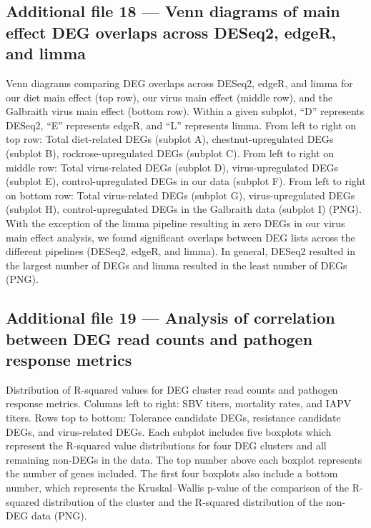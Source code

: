 \documentclass{bmcart}
\begin{document}
\begin{linenumbers}
\begin{backmatter}
   \subsection*{Additional file 18 --- Venn diagrams of main effect DEG overlaps across DESeq2, edgeR, and limma}
  Venn diagrams comparing DEG overlaps across DESeq2, edgeR, and limma for our diet main effect (top row), our virus main effect (middle row), and the Galbraith virus main effect (bottom row). Within a given subplot, ``D'' represents DESeq2, ``E'' represents edgeR, and ``L'' represents limma. From left to right on top row: Total diet-related DEGs (subplot A), chestnut-upregulated DEGs (subplot B), rockrose-upregulated DEGs (subplot C). From left to right on middle row: Total virus-related DEGs (subplot D), virus-upregulated DEGs (subplot E), control-upregulated DEGs in our data (subplot F). From left to right on bottom row: Total virus-related DEGs (subplot G), virus-upregulated DEGs (subplot H), control-upregulated DEGs in the Galbraith data (subplot I) (PNG). With the exception of the limma pipeline resulting in zero DEGs in our virus main effect analysis, we found significant overlaps between DEG lists across the different pipelines (DESeq2, edgeR, and limma). In general, DESeq2 resulted in the largest number of DEGs and limma resulted in the least number of DEGs (PNG). 
  
  \subsection*{Additional file 19 --- Analysis of correlation between DEG read counts and pathogen response metrics}
  Distribution of R-squared values for DEG cluster read counts and pathogen response metrics. Columns left to right: SBV titers, mortality rates, and IAPV titers. Rows top to bottom: Tolerance candidate DEGs, resistance candidate DEGs, and virus-related DEGs. Each subplot includes five boxplots which represent the R-squared value distributions for four DEG clusters and all remaining non-DEGs in the data. The top number above each boxplot represents the number of genes included. The first four boxplots also include a bottom number, which represents the Kruskal–Wallis p-value of the comparison of the R-squared distribution of the cluster and the R-squared distribution of the non-DEG data (PNG).
  
\end{backmatter}
\end{linenumbers} %
\end{document}
